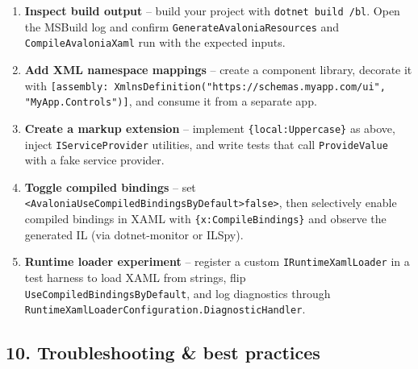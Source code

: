 \begin{enumerate}
\def\labelenumi{\arabic{enumi}.}
\tightlist
\item
  \textbf{Inspect build output} -- build your project with
  \passthrough{\lstinline!dotnet build /bl!}. Open the MSBuild log and
  confirm \passthrough{\lstinline!GenerateAvaloniaResources!} and
  \passthrough{\lstinline!CompileAvaloniaXaml!} run with the expected
  inputs.
\item
  \textbf{Add XML namespace mappings} -- create a component library,
  decorate it with
  \passthrough{\lstinline![assembly: XmlnsDefinition("https://schemas.myapp.com/ui", "MyApp.Controls")]!},
  and consume it from a separate app.
\item
  \textbf{Create a markup extension} -- implement
  \passthrough{\lstinline!\{local:Uppercase\}!} as above, inject
  \passthrough{\lstinline!IServiceProvider!} utilities, and write tests
  that call \passthrough{\lstinline!ProvideValue!} with a fake service
  provider.
\item
  \textbf{Toggle compiled bindings} -- set
  \passthrough{\lstinline!<AvaloniaUseCompiledBindingsByDefault>false>!},
  then selectively enable compiled bindings in XAML with
  \passthrough{\lstinline!\{x:CompileBindings\}!} and observe the
  generated IL (via dotnet-monitor or ILSpy).
\item
  \textbf{Runtime loader experiment} -- register a custom
  \passthrough{\lstinline!IRuntimeXamlLoader!} in a test harness to load
  XAML from strings, flip
  \passthrough{\lstinline!UseCompiledBindingsByDefault!}, and log
  diagnostics through
  \passthrough{\lstinline!RuntimeXamlLoaderConfiguration.DiagnosticHandler!}.
\end{enumerate}

\subsection{10. Troubleshooting \& best
practices}\label{troubleshooting-best-practices-4}

